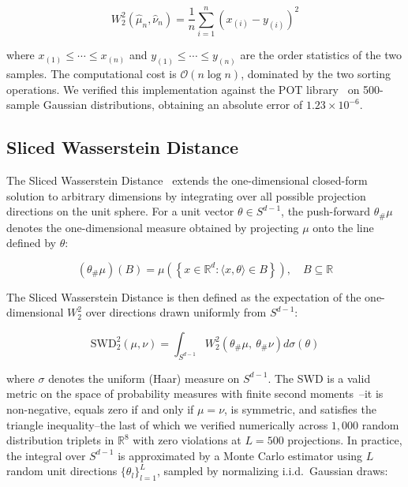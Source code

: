 \documentclass{article}
\begin{document}
	\begin{equation}
		W_2^2(\hat{\mu}_n, \hat{\nu}_n) = \frac{1}{n} \sum_{i=1}^{n} 
		\left( x_{(i)} - y_{(i)} \right)^2
		\label{eq:empirical_w2}
	\end{equation}
	
	where $x_{(1)} \leq \cdots \leq x_{(n)}$ and $y_{(1)} \leq \cdots \leq y_{(n)}$ are the order statistics of the two samples. The computational cost is $\mathcal{O}(n \log n)$, dominated by the two sorting operations. We verified this implementation against the POT library~\citep{remi} on 500-sample Gaussian distributions, obtaining an absolute error of $1.23 \times 10^{-6}$.
	
	\subsection{Sliced Wasserstein Distance}
	
	The Sliced Wasserstein Distance~\citep{rabin} extends the one-dimensional closed-form solution to arbitrary dimensions by integrating over all possible projection directions on the unit sphere. For a unit vector $\theta \in S^{d-1}$, the push-forward $\theta_\#\mu$ denotes the one-dimensional measure obtained by projecting $\mu$ onto the line defined by $\theta$:
	
	\begin{equation}
		(\theta_\#\mu)(B) = \mu\!\left(\left\{x \in \mathbb{R}^d : 
		\langle x, \theta \rangle \in B\right\}\right), \quad B \subseteq \mathbb{R}
		\label{eq:pushforward}
	\end{equation}
	
	The Sliced Wasserstein Distance is then defined as the expectation of the one-dimensional $W_2^2$ over directions drawn uniformly from $S^{d-1}$:
	
	\begin{equation}
		\mathrm{SWD}_2^2(\mu, \nu) = \int_{S^{d-1}} 
		W_2^2\!\left(\theta_\#\mu,\ \theta_\#\nu\right) d\sigma(\theta)
		\label{eq:swd}
	\end{equation}
	
	where $\sigma$ denotes the uniform (Haar) measure on $S^{d-1}$. The SWD is a valid metric on the space of probability measures with finite second moments~\cite{bonneel}--it is non-negative, equals zero if and only if $\mu = \nu$, is symmetric, and satisfies the triangle inequality--the last of which we verified numerically across $1{,}000$ random distribution triplets in $\mathbb{R}^8$ with zero violations at $L = 500$ projections. In practice, the integral over $S^{d-1}$ is approximated by a Monte Carlo estimator using $L$ random unit directions $\{\theta_l\}_{l=1}^L$, sampled by normalizing i.i.d.\ Gaussian draws:
	
\end{document}
